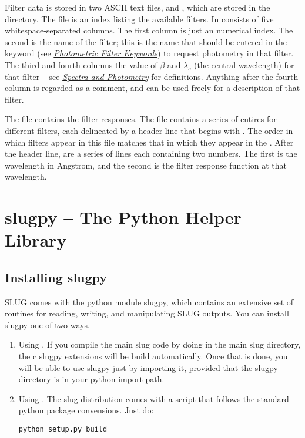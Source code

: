 \documentclass[letterpaper,10pt,english]{sphinxmanual}
\begin{document}
Filter data is stored in two ASCII text files,  and , which are stored in the  directory. The  file is an index listing the available filters. In consists of five whitespace-separated columns. The first column is just an numerical index. The second is the name of the filter; this is the name that should be entered in the  keyword (see {\hyperref[parameters:ssec\string-phot\string-keywords]{\emph{Photometric Filter Keywords}}}) to request photometry in that filter. The third and fourth columns the value of \(\beta\) and \(\lambda_c\) (the central wavelength) for that filter -- see {\hyperref[intro:ssec\string-spec\string-phot]{\emph{Spectra and Photometry}}} for definitions. Anything after the fourth column is regarded as a comment, and can be used freely for a description of that filter.

The  file contains the filter responses. The file contains a series of entires for different filters, each delineated by a header line that begins with \code{\#}. The order in which filters appear in this file matches that in which they appear in the . After the header line, are a series of lines each containing two numbers. The first is the wavelength in Angstrom, and the second is the filter response function at that wavelength.


\chapter{slugpy -- The Python Helper Library}
\label{slugpy:slugpy-the-python-helper-library}\label{slugpy:sec-slugpy}\label{slugpy::doc}

\section{Installing slugpy}
\label{slugpy:installing-slugpy}
SLUG comes with the python module slugpy, which contains an extensive set of routines for reading, writing, and manipulating SLUG outputs. You can install slugpy one of two ways.
\begin{enumerate}
\item {} 
Using . If you compile the main slug code by doing  in the main slug directory, the c slugpy extensions will be build automatically. Once that is done, you will be able to use slugpy just by importing it, provided that the slugpy directory is in your python import path.

\item {} 
Using . The slug distribution comes with a  script that follows the standard python package convensions. Just do:

\begin{Verbatim}[commandchars=\\\{\}]
python setup.py build
\end{Verbatim}

\end{enumerate}
\end{document}
